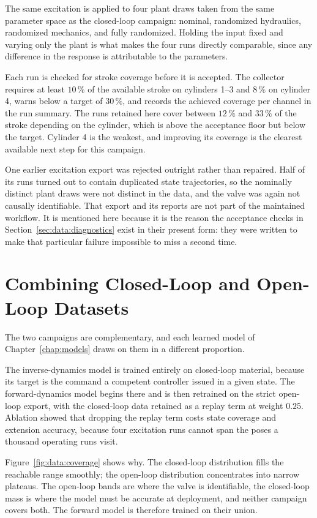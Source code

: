 The same excitation is applied to four plant draws taken from the same
parameter space as the closed-loop campaign: nominal, randomized
hydraulics, randomized mechanics, and fully randomized. Holding the
input fixed and varying only the plant is what makes the four runs
directly comparable, since any difference in the response is attributable
to the parameters.

Each run is checked for stroke coverage before it is accepted. The
collector requires at least $10\,\%$ of the available stroke on
cylinders 1--3 and $8\,\%$ on cylinder 4, warns below a target of
$30\,\%$, and records the achieved coverage per channel in the run
summary. The runs retained here cover between $12\,\%$ and $33\,\%$ of
the stroke depending on the cylinder, which is above the acceptance
floor but below the target. Cylinder 4 is the weakest, and improving its
coverage is the clearest available next step for this campaign.

One earlier excitation export was rejected outright rather than repaired.
Half of its runs turned out to contain duplicated state trajectories, so
the nominally distinct plant draws were not distinct in the data, and
the valve was again not causally identifiable. That export and its
reports are not part of the maintained workflow. It is mentioned here
because it is the reason the acceptance checks in
Section~\ref{sec:data:diagnostics} exist in their present form: they were
written to make that particular failure impossible to miss a second
time.

\section{Combining Closed-Loop and Open-Loop Datasets}
\label{sec:data:combining}

The two campaigns are complementary, and each learned model of
Chapter~\ref{chap:models} draws on them in a different proportion.

The inverse-dynamics model is trained entirely on closed-loop material,
because its target is the command a competent controller issued in a given
state. The forward-dynamics model begins there and is then retrained on the
strict open-loop export, with the closed-loop data retained as a replay term at
weight $0.25$. Ablation showed that dropping the replay term costs state
coverage and extension accuracy, because four excitation runs cannot span the
poses a thousand operating runs visit.

Figure~\ref{fig:data:coverage} shows why. The closed-loop distribution fills
the reachable range smoothly; the open-loop distribution concentrates into
narrow plateaus. The open-loop bands are where the valve is identifiable, the
closed-loop mass is where the model must be accurate at deployment, and neither
campaign covers both. The forward model is therefore trained on their union.

